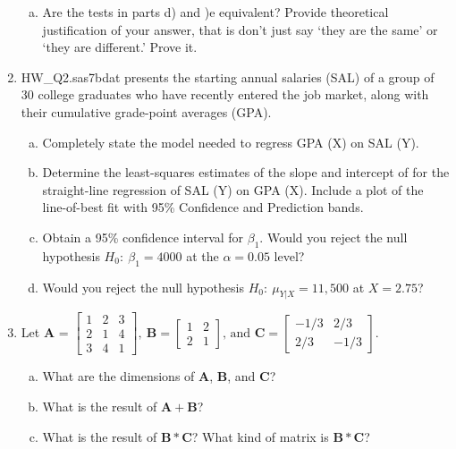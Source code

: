 \documentclass{article}
\begin{document}
\begin{enumerate}[Q 1.]
\begin{enumerate}[a)]
	\item Are the tests in parts d) and )e equivalent? Provide theoretical justification of your answer, that is don't just say `they are the same' or `they are different.' Prove it. 
	\end{enumerate}
\item HW\_Q2.sas7bdat presents the starting annual salaries (SAL) of a group of 30 college graduates who have recently entered the job market, along with their cumulative grade-point averages (GPA).
	\begin{enumerate}[a)]
	\item Completely state the model needed to regress GPA (X) on SAL (Y).
	\item Determine the least-squares estimates of the slope and intercept of for the straight-line regression of SAL (Y) on GPA (X). Include a plot of the line-of-best fit with 95\% Confidence and Prediction bands.
	\item Obtain a 95\% confidence interval for $\beta_1$. Would you reject the null hypothesis $H_0:~\beta_1 = 4000$ at the $\alpha=0.05$ level?
	\item Would you reject the null hypothesis $H_0:~ \mu_{Y|X} = 11,500$ at $X=2.75$?
	\end{enumerate}
	
	\newpage
	\clearpage

\item Let $\bm{A}$ = 
$\left[ \begin{array}{ccc} 
1 & 2 & 3\\ 
2 & 1 & 4 \\ 
3 & 4 & 1 
\end{array} \right] 
,~ \bm{B} = 
\left[ \begin{array}{cc} 
1 & 2 \\ 
2 & 1  
\end{array} \right] 
\mbox{, and }  \bm{C} = 
\left[ \begin{array}{cc} 
-1/3 & 2/3 \\ 
2/3 & -1/3  
\end{array} \right] . $
\begin{enumerate}[a)]
	\item What are the dimensions of $\bm{A}$, $\bm{B}$, and $\bm{C}$? 
	\item What is the result of $\bm{A} + \bm{B}$?
	\item What is the result of $\bm{B}*\bm{C}$?  What kind of matrix is $\bm{B}*\bm{C}$?
	\end{enumerate}


\end{enumerate}
\end{document}
